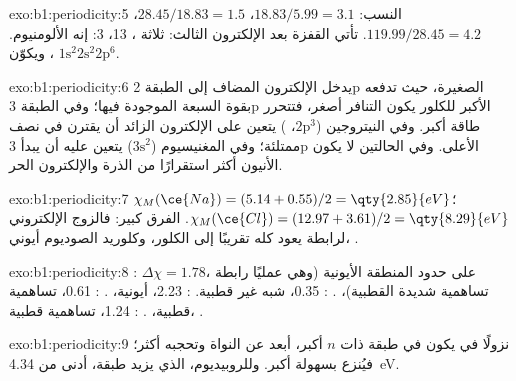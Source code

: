 \begin{solution}{exo:b1:periodicity:5}
النسب: $18.83/5.99 = 3.1$، $28.45/18.83 = 1.5$، $119.99/28.45 = 4.2$.
تأتي القفزة بعد الإلكترون الثالث: ثلاثة ،  13،
 3: إنه الألومنيوم. ويكوّن ، $1\text{s}^2 2\text{s}^2
2\text{p}^6$.
\end{solution}

\begin{solution}{exo:b1:periodicity:6}
يدخل الإلكترون المضاف إلى  الطبقة 2p الصغيرة، حيث
تدفعه بقوة  السبعة الموجودة فيها؛ وفي الطبقة 3p
الأكبر للكلور يكون التنافر أصغر، فتتحرر طاقة
أكبر. وفي النيتروجين ($2\text{p}^3$، ) يتعين على الإلكترون الزائد
أن يقترن في  نصف ممتلئة؛ وفي المغنيسيوم ($3\text{s}^2$)
يتعين عليه أن يبدأ  3p الأعلى. وفي الحالتين لا يكون
الأنيون أكثر استقرارًا من الذرة والإلكترون الحر.
\end{solution}

\begin{solution}{exo:b1:periodicity:7}
$\chi_M(\ce{Na}) = (5.14 + 0.55)/2 = \qty{2.85}{eV}$؛ $\chi_M(\ce{Cl}) =
(12.97 + 3.61)/2 = \qty{8.29}{eV}$. الفرق كبير: فالزوج الإلكتروني
لرابطة  يعود كله تقريبًا إلى الكلور، وكلوريد
الصوديوم أيوني، .
\end{solution}

\begin{solution}{exo:b1:periodicity:8}
: $\Delta\chi = 1.78$، على حدود المنطقة الأيونية (وهي
عمليًا رابطة تساهمية شديدة القطبية)، . : 0.35،
شبه غير قطبية. : 2.23، أيونية، . : 0.61،
تساهمية قطبية، . : 1.24، تساهمية
قطبية، .
\end{solution}

\begin{solution}{exo:b1:periodicity:9}
نزولًا في  يكون  في طبقة ذات $n$ أكبر، أبعد
عن النواة وتحجبه  أكثر؛ فيُنزع
بسهولة أكبر. وللروبيديوم، الذي يزيد طبقة،  أدنى من
\qty{4.34}{eV}.
\end{solution}

